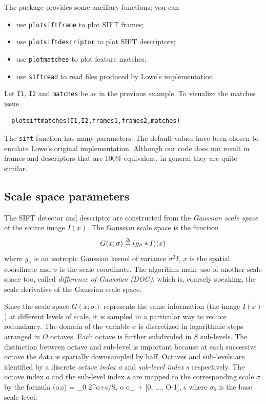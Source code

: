 \documentclass{article}
\let\oldtt=\tt
\renewcommand{\tt}{\oldtt\color{codecolor}}
\begin{document}
The package provides some ancillary functions; you can
\begin{itemize}
\item use {\tt plotsiftframe} to plot SIFT frames;
\item use {\tt plotsiftdescriptor} to plot SIFT descriptors;
\item use {\tt plotmatches} to plot feature matches;
\item use {\tt siftread} to read files produced by Lowe's implementation.
\end{itemize}

\begin{example}[Visualization]
Let {\tt I1}, {\tt I2} and {\tt matches} be as in the previous example. To visualize the matches issue
\begin{verbatim}
  plotsiftmatches(I1,I2,frames1,frames2,matches)
\end{verbatim}
\end{example}

The {\tt sift} function has many parameters. The default values have been chosen to emulate Lowe's original implementation. Although our code does not result in frames and descriptors that are 100\% equivalent, in general they are quite similar.

\subsection{Scale space parameters}\label{sift.user.ss}

The SIFT detector and descriptor are constructed from the {\em Gaussian scale space} of the source image $I(x)$. The Gaussian scale space is the function
\[
   G(x;\sigma) \overset{\Delta}{=} (g_\sigma*I)(x)
\]
where $g_\sigma$ is an isotropic Gaussian kernel of variance $\sigma^2 I$, $x$ is the spatial coordinate and $\sigma$ is the scale coordinate. The algorithm make use of another scale space too, called {\em difference of Gaussian (DOG)}, which is, coarsely speaking, the scale derivative of the Gaussian scale space. 

Since the scale space $G(x;\sigma)$ represents the same information (the image $I(x)$) at different levels of scale, it is sampled in a particular way to reduce redundancy. The domain of the variable $\sigma$ is discretized in logarithmic steps arranged in $O$ octaves. Each octave is further subdivided in $S$ sub-levels. The distinction between octave and sub-level is important because at each successive octave the data is spatially downsampled by half. Octaves and sub-levels are identified by a discrete {\em octave index} $o$ and {\em sub-level index} $s$ respectively. The octave index $o$ and the sub-level index $s$  are mapped to the corresponding scale $\sigma$ by the formula
\be\label{eq:scale}
  \sigma(o,s) = \sigma_0 2^{o+s/S},
  \quad o \in o_{\min} + [0, ..., O-1],
  \quad s \in [0,...,S-1]
\ee
where $\sigma_0$ is the base scale level.
\end{document}
